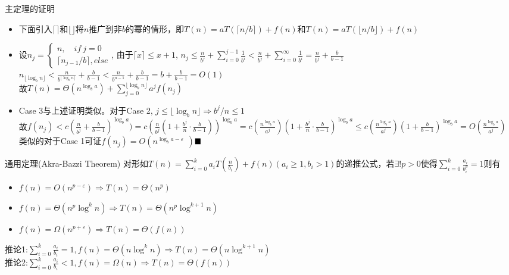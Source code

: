 \documentclass{ctexbeamer}
\begin{document}
    \begin{frame}{主定理的证明}
    \begin{itemize}
    \item 下面引入$\lceil\rceil$和$\lfloor\rfloor$将$n$推广到非$b$的幂的情形，即$T(n)=aT(\lceil n/b\rceil)+f(n)$和$T(n)=aT(\lfloor n/b\rfloor)+f(n)$
    \item 设$n_j=\begin{cases}n,\quad if\ j = 0\\ \lceil n_{j-1}/b\rceil,else\end{cases}$, 由于$\lceil x\rceil\leq x+1$, $n_j\leq \frac{n}{b^j}+\sum\limits_{i=0}^{j-1}\frac{1}{b^i}<\frac{n}{b^j}+\sum\limits_{i=0}^{\infty}\frac{1}{b^i}=\frac{n}{b^j}+\frac{b}{b-1}$\\
    $n_{\lfloor\log_bn\rfloor} < \frac{n}{b^{\lfloor\log_bn\rfloor}}+\frac{b}{b-1}<\frac{n}{b^{n-1}}+\frac{b}{b-1}=b+\frac{b}{b-1}=O(1)$\\
    故$T(n)=\Theta(n^{\log_ba})+\sum\limits_{j=0}^{\lfloor\log_bn\rfloor}a^jf(n_j)$\\
    \item Case 3与上述证明类似。对于Case 2, $j\leq \lfloor\log_bn\rfloor \Rightarrow b^j/n\leq 1$\\
    故$f(n_j)< c(\frac{n}{b^j}+\frac{b}{b-1})^{\log_ba})=c(\frac{n}{b^j}(1+\frac{b^j}{n}\cdot\frac{b}{b-1}))^{\log_ba}=c(\frac{n^{\log_ba}}{a^j})(1+\frac{b^j}{n}\cdot\frac{b}{b-1})^{\log_ba}\leq c(\frac{n^{\log_ba}}{a^j})(1+\frac{b}{b-1})^{\log_ba}=O(\frac{n^{\log_ba}}{a^j})$\\
    类似的对于Case 1可证$f(n_j)=O(n^{\log_ba-\varepsilon􏰀􏰇})$$\hfill\blacksquare$ 
    \end{itemize}
    \end{frame}

    \begin{frame}{通用定理(Akra-Bazzi Theorem)}
    对形如$T(n)=\sum\limits_{i=0}^ka_iT(\frac{n}{b_i})+f(n)(a_i\geq 1, b_i>1)$的递推公式，若$\exists!p>0$使得$\sum\limits_{i=0}^k\frac{a_i}{b_i^p}=1$则有
    \begin{itemize} 
        \setlength{\itemsep}{1em}
    \item $f(n)=O(n^{p-\varepsilon}) \Rightarrow T(n) = \Theta(n^p)$
    \item $f(n)=\Theta(n^p\log^kn) \Rightarrow T(n)=\Theta(n^p\log^{k+1}n)$
    \item $f(n)=\Omega(n^{p+\varepsilon})\Rightarrow T(n)=\Theta(f(n))$
    \end{itemize}
    推论1:\quad $\sum\limits_{i=0}^k\frac{a_i}{b_i}=1,f(n)=\Theta(n\log^k n) \Rightarrow T(n)=\Theta(n\log^{k+1} n)$\\
    推论2:\quad $\sum\limits_{i=0}^k\frac{a_i}{b_i}<1,f(n)=\Omega(n) \Rightarrow T(n)=\Theta(f(n))$
    \end{frame}
\end{document}
